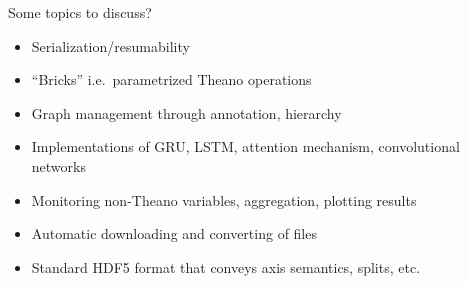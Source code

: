\documentclass[twoside,11pt]{article}
\begin{document}
Some topics to discuss?

\begin{itemize}
  \item Serialization/resumability
  \item ``Bricks'' i.e.\ parametrized Theano operations
  \item Graph management through annotation, hierarchy
  \item Implementations of GRU, LSTM, attention mechanism, convolutional
  networks
  \item Monitoring non-Theano variables, aggregation, plotting results
\end{itemize}

\begin{itemize}
  \item Automatic downloading and converting of files
  \item Standard HDF5 format that conveys axis semantics, splits, etc.
\end{itemize}






\end{document}
